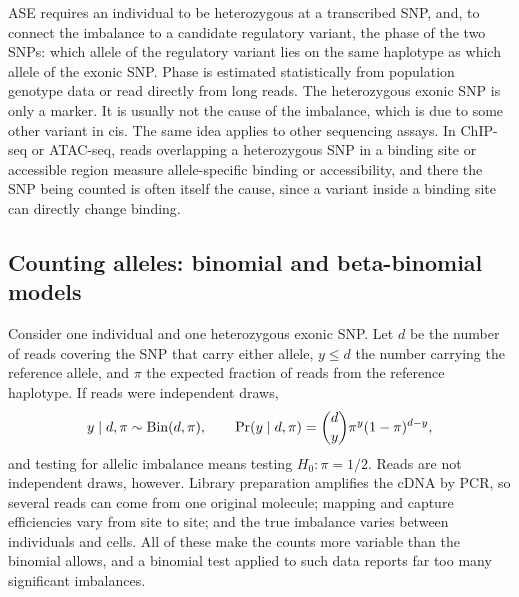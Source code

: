 ASE requires an individual to be heterozygous at a transcribed SNP, and, to connect the imbalance to a candidate regulatory variant, the phase of the two SNPs: which allele of the regulatory variant lies on the same haplotype as which allele of the exonic SNP. Phase is estimated statistically from population genotype data or read directly from long reads. The heterozygous exonic SNP is only a marker. It is usually not the cause of the imbalance, which is due to some other variant in cis. The same idea applies to other sequencing assays. In ChIP-seq or ATAC-seq, reads overlapping a heterozygous SNP in a binding site or accessible region measure allele-specific binding or accessibility, and there the SNP being counted is often itself the cause, since a variant inside a binding site can directly change binding.

\subsection{Counting alleles: binomial and beta-binomial models}

Consider one individual and one heterozygous exonic SNP. Let $d$ be the number of reads covering the SNP that carry either allele, $y\leq d$ the number carrying the reference allele, and $\pi$ the expected fraction of reads from the reference haplotype. If reads were independent draws,
\begin{equation}
  y\mid d,\pi \sim \operatorname{Bin}(d,\pi), \qquad \Pr(y\mid d,\pi) = \binom{d}{y}\pi^y(1-\pi)^{d-y},
\end{equation}
and testing for allelic imbalance means testing $H_0:\pi=1/2$. Reads are not independent draws, however. Library preparation amplifies the cDNA by PCR, so several reads can come from one original molecule; mapping and capture efficiencies vary from site to site; and the true imbalance varies between individuals and cells. All of these make the counts more variable than the binomial allows, and a binomial test applied to such data reports far too many significant imbalances.


